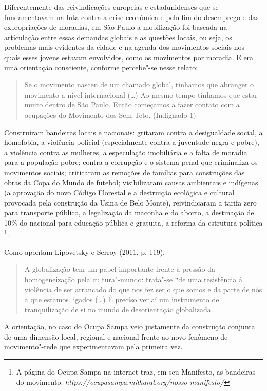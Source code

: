 Diferentemente das reivindicações europeias e estadunidenses que se
fundamentavam na luta contra a crise econômica e pelo fim do desemprego
e das expropriações de moradias, em São Paulo a mobilização foi baseada
na articulação entre essas demandas globais e as questões locais, ou
seja, os problemas mais evidentes da cidade e na agenda dos movimentos
sociais nos quais esses jovens estavam envolvidos, como os movimentos
por moradia. E era uma orientação consciente, conforme percebe"-se nesse
relato:

\begin{quote}
Se o movimento nasceu de um chamado global, tínhamos que abranger o
movimento a nível internacional (\ldots{}) Ao mesmo tempo tínhamos que estar
muito dentro de São Paulo. Então começamos a fazer contato com a
ocupações do Movimento dos Sem Teto. (Indignado 1)
\end{quote}

Construíram bandeiras locais e nacionais: gritaram contra a desigualdade
social, a homofobia, a violência policial (especialmente contra a
juventude negra e pobre), a violência contra as mulheres, a especulação
imobiliária e a falta de moradia para a população pobre; contra a
corrupção e o sistema penal que criminaliza os movimentos sociais;
criticaram as remoções de famílias para construções das obras da Copa do
Mundo de futebol; visibilizaram causas ambientais e indígenas (a
aprovação do novo Código Florestal e a destruição ecológica e cultural
provocada pela construção da Usina de Belo Monte), reivindicaram a
tarifa zero para transporte público, a legalização da maconha e do
aborto, a destinação de 10\% do  nacional para educação pública e
gratuita, a reforma da estrutura política \footnote{A página do Ocupa
  Sampa na internet traz, em seu Manifesto, as bandeiras do movimento:
  \emph{https://ocupasampa.milharal.org/nosso-manifesto/}}.

Como apontam Lipovetsky e Serroy (2011, p. 119),

\begin{quote}
A globalização tem um papel importante frente à pressão da
homogeneização pela cultura"-mundo: trata"-se ``de uma resistência à
violência de ser arrancado do que nos fez ser o que somos e da parte de
nós a que estamos ligados (\ldots{}) É preciso ver aí um instrumento de
tranquilização de si no mundo de desorientação globalizada.
\end{quote}

A orientação, no caso do Ocupa Sampa veio justamente da construção
conjunta de uma dimensão local, regional e nacional frente ao novo
fenômeno de movimento"-rede que experimentavam pela primeira vez.


